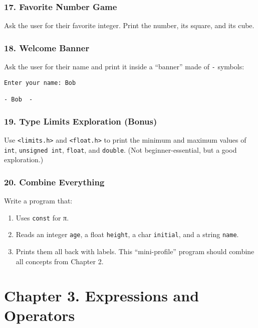 \documentclass[
  letterpaper,
  DIV=11,
  numbers=noendperiod]{scrreprt}
\providecommand{\tightlist}{%
  \setlength{\itemsep}{0pt}\setlength{\parskip}{0pt}}
\begin{document}
\subsubsection{17. Favorite Number Game}\label{favorite-number-game}

Ask the user for their favorite integer. Print the number, its square,
and its cube.

\subsubsection{18. Welcome Banner}\label{welcome-banner}

Ask the user for their name and print it inside a ``banner'' made of
\texttt{-} symbols:

\begin{verbatim}
Enter your name: Bob

- Bob  -
\end{verbatim}

\subsubsection{19. Type Limits Exploration
(Bonus)}\label{type-limits-exploration-bonus}

Use \texttt{\textless{}limits.h\textgreater{}} and
\texttt{\textless{}float.h\textgreater{}} to print the minimum and
maximum values of \texttt{int}, \texttt{unsigned\ int}, \texttt{float},
and \texttt{double}. (Not beginner-essential, but a good exploration.)

\subsubsection{20. Combine Everything}\label{combine-everything}

Write a program that:

\begin{enumerate}
\def\labelenumi{\arabic{enumi}.}
\tightlist
\item
  Uses \texttt{const} for π.
\item
  Reads an integer \texttt{age}, a float \texttt{height}, a char
  \texttt{initial}, and a string \texttt{name}.
\item
  Prints them all back with labels. This ``mini-profile'' program should
  combine all concepts from Chapter 2.
\end{enumerate}

\section{Chapter 3. Expressions and
Operators}\label{chapter-3.-expressions-and-operators}
\end{document}
